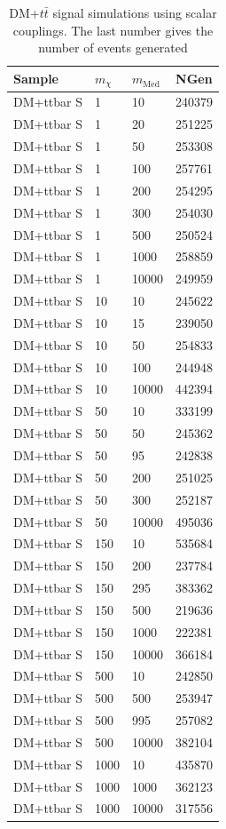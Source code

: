 \begin{table}[]
\centering
\begin{tabular}{llll}
\hline \hline
Sample & $m_\chi$    & $m_\textrm{Med}$    & NGen \\ \hline
DM+ttbar  S  & 1    & 10    & 240379 \\
DM+ttbar  S  & 1    & 20    & 251225 \\
DM+ttbar  S  & 1    & 50    & 253308 \\
DM+ttbar  S  & 1    & 100   & 257761 \\
DM+ttbar  S  & 1    & 200   & 254295 \\
DM+ttbar  S  & 1    & 300   & 254030 \\
DM+ttbar  S  & 1    & 500   & 250524 \\
DM+ttbar  S  & 1    & 1000  & 258859 \\
DM+ttbar  S  & 1    & 10000 & 249959 \\
DM+ttbar  S  & 10   & 10    & 245622 \\
DM+ttbar  S  & 10   & 15    & 239050 \\
DM+ttbar  S  & 10   & 50    & 254833 \\
DM+ttbar  S  & 10   & 100   & 244948 \\
DM+ttbar  S  & 10   & 10000 & 442394 \\
DM+ttbar  S  & 50   & 10    & 333199 \\
DM+ttbar  S  & 50   & 50    & 245362 \\
DM+ttbar  S  & 50   & 95    & 242838 \\
DM+ttbar  S  & 50   & 200   & 251025 \\
DM+ttbar  S  & 50   & 300   & 252187 \\
DM+ttbar  S  & 50   & 10000 & 495036 \\
DM+ttbar  S  & 150  & 10    & 535684 \\
DM+ttbar  S  & 150  & 200   & 237784 \\
DM+ttbar  S  & 150  & 295   & 383362 \\
DM+ttbar  S  & 150  & 500   & 219636 \\
DM+ttbar  S  & 150  & 1000  & 222381 \\
DM+ttbar  S  & 150  & 10000 & 366184 \\
DM+ttbar  S  & 500  & 10    & 242850 \\
DM+ttbar  S  & 500  & 500   & 253947 \\
DM+ttbar  S  & 500  & 995   & 257082 \\
DM+ttbar  S  & 500  & 10000 & 382104 \\
DM+ttbar  S  & 1000 & 10    & 435870 \\
DM+ttbar  S  & 1000 & 1000  & 362123 \\
DM+ttbar  S  & 1000 & 10000 & 317556 \\
\hline \hline
\end{tabular}
\caption{DM+$t\bar{t}$ signal simulations using scalar couplings. The last number gives the number of events generated}
\label{tab:dmtt_s}
\end{table}


